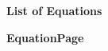 \begin{titlepage}
\label{front:equations}
\begin{center}{\fontsize{14}{18}\selectfont\textbf{List of Equations}}\end{center}
\vspace*{48pt}
\noindent\textbf{Equation}\hfill\textbf{Page}\par\vspace{12pt}
{\fontsize{12}{14}\selectfont\makeatletter{}\makeatother}
\end{titlepage}
